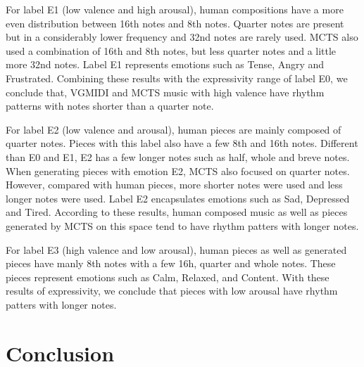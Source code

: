 For label E1 (low valence and high arousal), human compositions have a more even distribution between 16th notes and 8th notes. Quarter notes are present but in a considerably lower frequency and 32nd notes are rarely used. MCTS also used a combination of 16th and 8th notes, but less quarter notes and a little more 32nd notes.
Label E1 represents emotions such as Tense, Angry and Frustrated.
Combining these results with the expressivity range of label E0, we conclude that, VGMIDI and MCTS music with high valence have rhythm
patterns with notes shorter than a quarter note.

For label E2 (low valence and arousal), human  pieces are mainly composed of quarter notes. Pieces with this label also have a few 8th and 16th notes. Different than E0 and E1, E2 has a few longer notes such as half, whole and breve notes. When generating pieces with emotion E2, MCTS also focused on quarter notes. However, compared with human pieces, more shorter notes were used and less longer notes were used. Label E2 encapsulates emotions such as Sad, Depressed and Tired. According to these results, human composed music as well as pieces generated by MCTS on this space tend to have rhythm patters with longer notes.


For label E3 (high valence and low arousal), human pieces as well as generated pieces have manly 8th notes with a few 16h, quarter and whole notes.  These pieces represent emotions such as Calm, Relaxed, and Content. With these results of expressivity, we conclude that pieces with low arousal have rhythm patters with longer notes.


\section{Conclusion}

